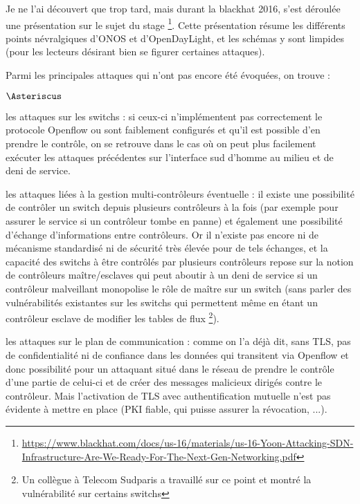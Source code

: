 Je ne l'ai découvert que trop tard, mais durant la blackhat 2016, s'est déroulée une présentation sur le sujet du stage \footnote{\url{https://www.blackhat.com/docs/us-16/materials/us-16-Yoon-Attacking-SDN-Infrastructure-Are-We-Ready-For-The-Next-Gen-Networking.pdf}}. Cette présentation résume les différents points névralgiques d'ONOS et d'OpenDayLight, et les schémas y sont limpides (pour les lecteurs désirant bien se figurer certaines attaques). 

Parmi les principales attaques qui n'ont pas encore été évoquées, on trouve :

\begin{list}{$\Asteriscus$}{}

\item les attaques sur les switchs : si ceux-ci n'implémentent pas correctement le protocole Openflow ou sont faiblement configurés et qu'il est possible d'en prendre le contrôle, on se retrouve dans le cas où on peut plus facilement exécuter les attaques précédentes sur l'interface sud d'homme au milieu et de deni de service.

\item les attaques liées à la gestion multi-contrôleurs éventuelle : il existe une possibilité de contrôler un switch depuis plusieurs contrôleurs à la fois (par exemple pour assurer le service si un contrôleur tombe en panne) et également une possibilité d'échange d'informations entre contrôleurs. Or il n'existe pas encore ni de mécanisme standardisé ni de sécurité très élevée pour de tels échanges, et la capacité des switchs à être contrôlés par plusieurs contrôleurs repose sur la notion de contrôleurs maître/esclaves qui peut aboutir à un deni de service si un contrôleur malveillant monopolise le rôle de maître sur un switch (sans parler des vulnérabilités existantes sur les switchs qui permettent même en étant un contrôleur esclave de modifier les tables de flux \footnote{Un collègue à Telecom Sudparis a travaillé sur ce point et montré la vulnérabilité sur certains switchs}).

\item les attaques sur le plan de communication : comme on l'a déjà dit, sans TLS, pas de confidentialité ni de confiance dans les données qui transitent via Openflow et donc possibilité pour un attaquant situé dans le réseau de prendre le contrôle d'une partie de celui-ci et de créer des messages malicieux dirigés contre le contrôleur. Mais l'activation de TLS avec authentification mutuelle n'est pas évidente à mettre en place (PKI fiable, qui puisse assurer la révocation, ...).


\end{list}
